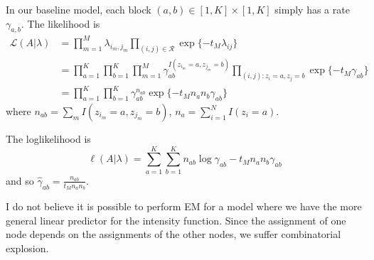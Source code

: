 \documentclass[11pt]{article}
\begin{document}
In our baseline model, each block $(a,b) \in [1,K] \times [1,K]$ simply has a rate $\gamma_{a,b}$.
The likelihood is
\begin{align*}
\mathcal{L}(A|\lambda) &= \prod_{m=1}^M \lambda_{i_m,j_m} \prod_{(i,j) \in \mathcal{R}} \exp\{-t_M\lambda_{ij}\} \\
& =\prod_{a=1}^K \prod_{b=1}^K \prod_{m=1}^M \gamma_{ab}^{I(z_{i_m}=a,z_{j_m}=b)} \prod_{(i,j): z_i=a,z_j=b} \exp\{-t_M\gamma_{ab}\} \\
& =\prod_{a=1}^K\prod_{b=1}^K \gamma_{ab}^{n_{ab}} \exp\{-t_Mn_an_b\gamma_{ab}\}
\end{align*}
where $n_{ab} = \sum_m I(z_{i_m}=a,z_{j_m}=b)$, $n_a = \sum_{i=1}^N I(z_i=a)$.

The loglikelihood is $$\ell(A|\lambda) = \sum_{a=1}^K \sum_{b=1}^K n_{ab} \log \gamma_{ab} - t_M n_a n_b \gamma_{ab}$$
and so $\hat{\gamma}_{ab} = \frac{n_{ab}}{t_Mn_an_b}$.


I do not believe it is possible to perform EM for a model where we have the more general linear predictor for the intensity function.  Since the assignment of one node depends on the assignments of the other nodes, we suffer combinatorial explosion.


\end{document}
